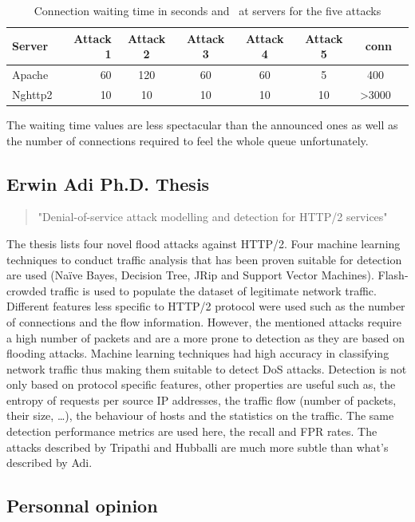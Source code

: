 \documentclass[11pt, a4paper]{article}
\begin{document}
\begin{table}[ht]
\begin{tabular}{@{} lr c c c c c c @{}}
	\toprule
		Server & Attack 1 & Attack 2 & Attack 3 & Attack 4 & Attack 5 & \textnumero~conn\\
	\midrule
		Apache & 60 & 120 & 60 & 60 & 5 & 400\\
		Nghttp2 & 10 & 10 & 10 & 10 & 10 & >3000\\
	\bottomrule
\end{tabular}
	\centering
    \caption{Connection waiting time in seconds and \textnumero~at servers for the five attacks}
	\label{tab:results}
\end{table}

The waiting time values are less spectacular than the announced ones as well as the number of connections required to feel the whole queue unfortunately.

\subsection{Erwin Adi Ph.D. Thesis}

	\begin{quote}
		"Denial-of-service attack modelling and detection for HTTP/2 services"
	\end{quote}

The thesis \cite{Adi:2017} lists four novel flood attacks against HTTP/2.
Four machine learning techniques to conduct traffic analysis that has been proven suitable for detection are used (Naïve Bayes, Decision Tree, JRip and Support Vector Machines).
Flash-crowded traffic is used to populate the dataset of legitimate network traffic.
Different features less specific to HTTP/2 protocol were used such as the number of connections and the flow information.
However, the mentioned attacks require a high number of packets and are a more prone to detection as they are based on flooding attacks.
Machine learning techniques had high accuracy in classifying network traffic thus making them suitable to detect DoS attacks.
Detection is not only based on protocol specific features, other properties are useful such as, the entropy of requests per source IP addresses, the traffic flow (number of packets, their size, \ldots), the behaviour of hosts and the statistics on the traffic.
The same detection performance metrics are used here, the recall and FPR rates.
The attacks described by Tripathi and Hubballi are much more subtle than what's described by Adi.

\subsection{Personnal opinion}
\end{document}
